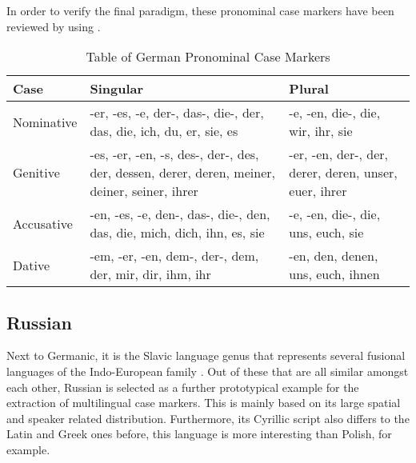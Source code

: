 \documentclass[11pt,a4paper,twoside,openright]{scrbook}
\begin{document}
In order to verify the final paradigm, these pronominal case markers have been reviewed by using \citet{eisenberg2020ger}.

\begin{table}[!htbp]
\centering
\begin{tabular}{|p{}||p{5cm}|p{5cm}|} 
 \hline
 Case & Singular & Plural \\ [1ex]
 \hline\hline
 Nominative &  -er, -es, -e, der-, das-, die-, der, das, die, ich, du, er, sie, es & -e, -en, die-, die, wir, ihr, sie \\ [1ex]
 \hline
 Genitive & -es, -er, -en, -s, des-, der-, des, der, dessen, derer, deren, meiner, deiner, seiner, ihrer & -er, -en, der-, der, derer, deren, unser, euer, ihrer \\ [1ex]
 \hline
 Accusative & -en, -es, -e, den-, das-, die-, den, das, die, mich, dich, ihn, es, sie & -e, -en, die-, die, uns, euch, sie  \\ [1ex]
 \hline
 Dative & -em, -er, -en, dem-, der-, dem, der, mir, dir, ihm, ihr & -en, den, denen, uns, euch, ihnen  \\ [1ex]
 \hline
\end{tabular}
\caption{Table of German Pronominal Case Markers }
\label{table:german_pronouns}
\end{table}


\newpage



\subsection{Russian}

Next to Germanic, it is the Slavic language genus that represents several fusional languages of the Indo-European family \citep{wals}. Out of these that are all similar amongst each other, Russian is selected as a further prototypical example for the extraction of multilingual case markers. This is mainly based on its large spatial and speaker related distribution. Furthermore, its Cyrillic script also differs to the Latin and Greek ones before, this language is more interesting than Polish, for example.
\end{document}
